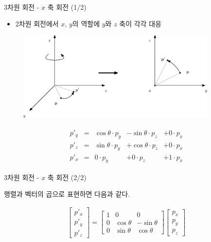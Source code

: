 \begin{frame}{3차원 회전 - $x$ 축 회전 (1/2)}

\begin{itemize}
\item 2차원 회전에서 $x$, $y$의 역할에 $y$와 $z$ 축이 각각 대응
\end{itemize}

\begin{figure}
    \includegraphics[width=10cm]{Math_transform/xAxisRotation.eps}
\end{figure}

\begin{eqnarray}
\begin{array}{clrrr}
p'_y  & = &\cos \theta \cdot p_y &- \sin \theta \cdot p_z &+ 0 \cdot p_x \\
p'_z  & = &\sin \theta \cdot p_y &+ \cos \theta \cdot p_z &+ 0 \cdot p_x \\
p'_x  & = & 0 \cdot p_y &+ 0 \cdot p_z &+ 1 \cdot p_x
\end{array} \nonumber
\end{eqnarray}


\end{frame}

\begin{frame}{3차원 회전 - $x$ 축 회전 (2/2)}

행렬과 벡터의 곱으로 표현하면 다음과 같다.

\begin{eqnarray}
\left [ \begin{array}{c} p'_x \\ p'_y \\ p'_z  \end{array} \right ] 
=
\left [ \begin{array}{rrr}
1 & 0 & 0 \\
0 & \cos \theta & - \sin \theta \\
0 & \sin \theta & \cos \theta
\end{array} \right ]
\left [ \begin{array}{c} p_x \\ p_y \\ p_z \end{array} \right ]  \nonumber
\end{eqnarray}

\end{frame}


